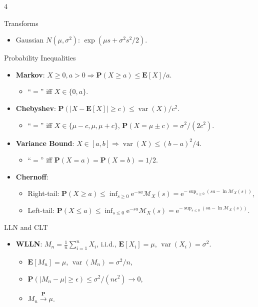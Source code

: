 \documentclass[landscape,a4paper]{article}
\newcommand{\e}{\mathrm{e}}
\newcommand{\PP}{\mathbf{P}}
\newcommand{\EE}{\mathbf{E}}
\newcommand{\var}{\operatorname{var}}
\begin{document}
\begin{multicols*}{4}
\begin{card}{Transforms}
\begin{itemize}
\begin{itemize}
					\item Gaussian $N(\mu,\sigma^2)$: $\exp(\mu s+\sigma^2s^2/2)$.
				\end{itemize}
			\end{itemize}
		\end{card}
		\begin{card}{Probability Inequalities}
			\begin{itemize}
				\item \textbf{Markov}: $X\ge0,a>0\Rightarrow \PP(X\ge a)\le \EE[X]/a$.
				\begin{itemize}
					\item ``$=$'' iff $X\in\{0,a\}$.
				\end{itemize}
				\item \textbf{Chebyshev}: $\PP(|X-\EE[X]|\ge c)\le \var(X)/c^2$.
				\begin{itemize}
					\item ``$=$'' iff $X\in\{\mu-c,\mu,\mu+c\}$, $\PP(X=\mu\pm c)=\sigma^2/(2c^2)$.
				\end{itemize}
				\item \textbf{Variance Bound}: $X\in[a,b]\Rightarrow\var(X)\le(b-a)^2/4$.
				\begin{itemize}
					\item ``$=$'' iff $\PP(X=a)=\PP(X=b)=1/2$.
				\end{itemize}
				\item \textbf{Chernoff}:
				\begin{itemize}
					\item Right-tail: $\PP(X\ge a)\le \inf_{s\ge0}\e^{-sa}\mathscr{M}_X(s)=\e^{-\sup_{s\ge0}(sa-\ln\mathscr{M}_X(s))}$,
					\item Left-tail: $\PP(X\le a)\le \inf_{s\le0}\e^{-sa}\mathscr{M}_X(s)=\e^{-\sup_{s\le0}(sa-\ln\mathscr{M}_X(s))}$.
				\end{itemize}
			\end{itemize}
		\end{card}
		\begin{card}{LLN and CLT}
			\begin{itemize}
				\item \textbf{WLLN}: $M_n=\frac{1}{n}\sum_{i=1}^nX_i$, i.i.d., $\EE[X_i]=\mu$, $\var(X_i)=\sigma^2$.
				\begin{itemize}
					\item $\EE[M_n]=\mu$, $\var(M_n)=\sigma^2/n$,
					\item $\PP(|M_n-\mu|\ge\epsilon)\le\sigma^2/(n\epsilon^2)\to0$,
					\item $M_n\xrightarrow{\PP}\mu$.

\end{itemize}
\end{itemize}
\end{card}
\end{multicols*}
\end{document}
